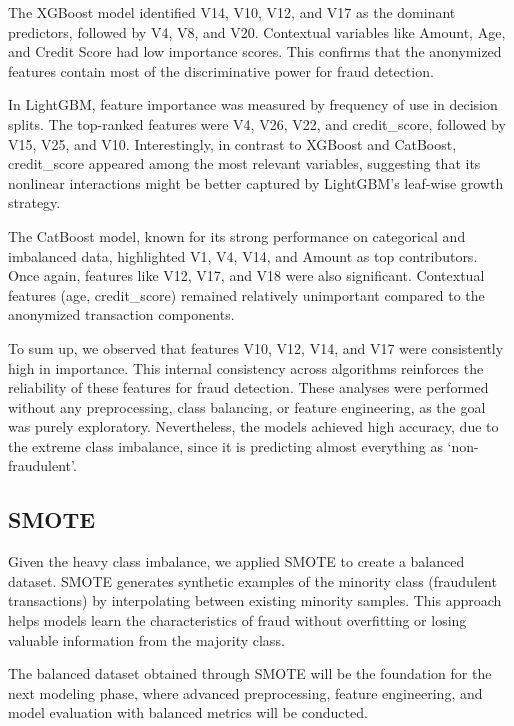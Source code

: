 \documentclass[12pt]{report} %
\begin{document}
The XGBoost model identified V14, V10, V12, and V17 as the dominant predictors, followed by V4, V8, and V20. Contextual variables like Amount, Age, and Credit Score had low importance scores. This confirms that the anonymized features contain most of the discriminative power for fraud detection.

In LightGBM, feature importance was measured by frequency of use in decision splits. The top-ranked features were V4, V26, V22, and credit\_score, followed by V15, V25, and V10. Interestingly, in contrast to XGBoost and CatBoost, credit\_score appeared among the most relevant variables, suggesting that its nonlinear interactions might be better captured by LightGBM’s leaf-wise growth strategy.

The CatBoost model, known for its strong performance on categorical and imbalanced data, highlighted V1, V4, V14, and Amount as top contributors. Once again, features like V12, V17, and V18 were also significant. Contextual features (age, credit\_score) remained relatively unimportant compared to the anonymized transaction components.

To sum up, we observed that features V10, V12, V14, and V17 were consistently high in importance. This internal consistency across algorithms reinforces the reliability of these features for fraud detection. 
These analyses were performed without any preprocessing, class balancing, or feature engineering, as the goal was purely exploratory. Nevertheless, the models achieved high accuracy, due to the extreme class imbalance, since it is predicting almost everything as ‘non-fraudulent’. 


\subsection{SMOTE}

Given the heavy class imbalance, we applied SMOTE to create a balanced dataset. SMOTE generates synthetic examples of the minority class (fraudulent transactions) by interpolating between existing minority samples. This approach helps models learn the characteristics of fraud without overfitting or losing valuable information from the majority class.

The balanced dataset obtained through SMOTE will be the foundation for the next modeling phase, where advanced preprocessing, feature engineering, and model evaluation with balanced metrics will be conducted.

\end{document}
